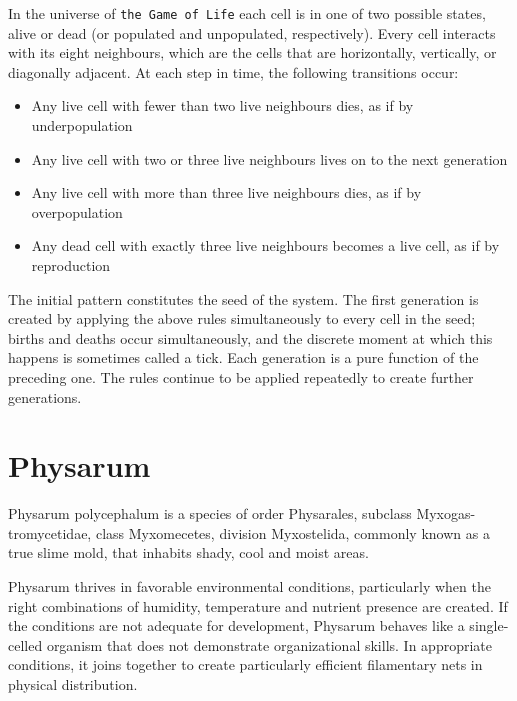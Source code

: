 \par
In the universe of \texttt{the Game of Life} each cell is in one of two possible states, alive or dead (or populated and unpopulated, respectively). Every cell interacts with its eight neighbours, which are the cells that are horizontally, vertically, or diagonally adjacent. At each step in time, the following transitions occur:
\begin{itemize}
\item Any live cell with fewer than two live neighbours dies, as if by underpopulation
\item Any live cell with two or three live neighbours lives on to the next generation
\item Any live cell with more than three live neighbours dies, as if by overpopulation
\item Any dead cell with exactly three live neighbours becomes a live cell, as if by reproduction
\end{itemize}
\par
The initial pattern constitutes the seed of the system. The first generation is created by applying the above rules simultaneously to every cell in the seed; births and deaths occur simultaneously, and the discrete moment at which this happens is sometimes called a tick. Each generation is a pure function of the preceding one. The rules continue to be applied repeatedly to create further generations. 

\section{Physarum}

Physarum polycephalum \cite{DBLP:journals/corr/abs-1712-02910} is a species of order Physarales, subclass Myxogas-tromycetidae, class Myxomecetes, division Myxostelida, commonly known as a true slime mold, that inhabits shady, cool and moist areas. 
\par
Physarum thrives in favorable environmental conditions, particularly when the right combinations of humidity, temperature and nutrient presence are created. If the conditions are not adequate for development, Physarum behaves like a single-celled organism that does not demonstrate organizational skills. In appropriate conditions, it joins together to create particularly efficient filamentary nets in physical distribution.
